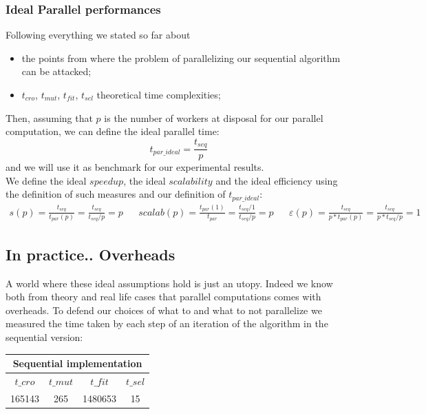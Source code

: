 \documentclass[11pt]{article}
\begin{document}
\subsubsection{Ideal Parallel performances}
Following everything we stated so far about
\begin{itemize}
  \item the points from where the problem of parallelizing our sequential algorithm can be attacked;
  \item  $ t_{cro}$, $ t_{mut}$, $t_{fit}$, $t_{sel}$ theoretical time complexities;
\end{itemize} 
Then, assuming that $ p $ is the number of workers at disposal for our parallel computation, we can define the ideal parallel time:
\[ t_{par\_ideal} = \frac{t_{seq}}{p} \]
and we will use it as benchmark for our experimental results.\\
We define the ideal $ speedup $, the ideal $ scalability $ and the ideal efficiency using the definition of such measures and our definition of $ t_{par\_ideal} $:
\begin{align*}
s(p) = \frac{t_{seq}}{t_{par}(p)} = \frac{t_{seq}}{t_{seq}/p} = p 
&
& scalab(p) = \frac{t_{par}(1)}{t_{par}} = \frac{t_{seq}/1}{t_{seq}/p} = p 
&
& \varepsilon(p) = \frac{t_{seq}}{p*t_{par}(p)} = \frac{t_{seq}}{p*t_{seq}/p} = 1 
\end{align*}

\subsection{In practice.. Overheads}
A world where these ideal assumptions hold is just an utopy. Indeed we know both from theory and real life cases that parallel computations comes with overheads. To defend our choices of what to and what to not parallelize we measured the time taken by each step of an iteration of the algorithm in the sequential version:
\begin{table}[h]
	\begin{center}
	  \begin{tabular}{||c | c | c | c||}
	  \multicolumn{4}{||c||}{Sequential implementation} \\ \hline
	  $ t\_cro $ & $ t\_mut $  & $t\_fit$ & $t\_sel $  \\ \hline
	  165143&265&1480653&15 \\ \hline
	  \end{tabular}
	\end{center}
\end{table}
\end{document}
